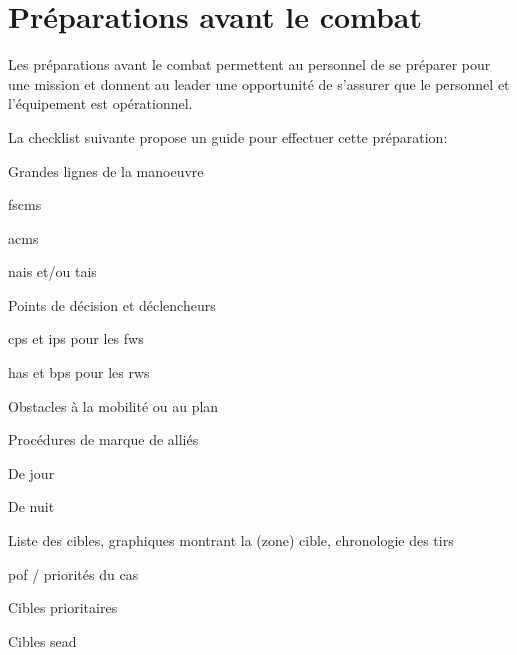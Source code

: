 \section{Préparations avant le combat}

\begin{e1}
	\item Les préparations avant le combat permettent au personnel de se préparer pour une mission et donnent au leader une opportunité de s'assurer que le personnel et l'équipement est opérationnel.
	\item La checklist suivante propose un guide pour effectuer cette préparation:
	\begin{e2}
		\begin{e3}
			\item Grandes lignes de la manoeuvre
			\item \glspl{fscm}
			\item \glspl{acm}
			\item \glspl{nai} et/ou \glspl{tai}
			\item Points de décision et déclencheurs
			\item \glspl{cp} et \glspl{ip} pour les \glspl{fw}
			\item \glspl{ha} et \glspl{bp} pour les \glspl{rw}
			\item Obstacles à la mobilité ou au plan
			\item Procédures de marque de alliés
			\begin{e4}
				\item De jour
				\item De nuit
			\end{e4}
			\item Liste des cibles, graphiques montrant la (zone) cible, chronologie des tirs
			\begin{e4}
				\item \gls{pof} / priorités du \gls{cas}
				\item Cibles prioritaires
				\item Cibles \gls{sead}
			\end{e4}
		\end{e3}
	\end{e2}
\end{e1}